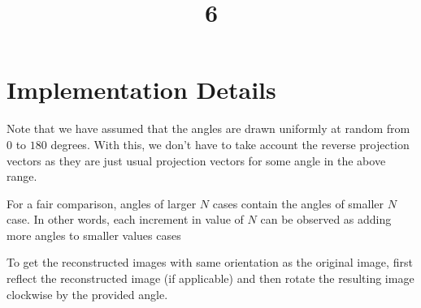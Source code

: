 \documentclass[a4paper, landscape]{article}
\title{6}
\date{}
\begin{document}
\maketitle
\section{Implementation Details}
Note that we have assumed that the angles are drawn uniformly at random from $0$ to $180$ degrees. With this, we don't have to take account the reverse projection vectors as they are just usual projection vectors for some angle in the above range.

For a fair comparison, angles of larger $N$ cases contain the angles of smaller $N$ case. In other words, each increment in value of $N$ can be observed as adding more angles to smaller values cases

To get the reconstructed images with same orientation as the original image, first reflect the reconstructed image (if applicable) and then rotate the resulting image clockwise by the provided angle.
\end{document}
